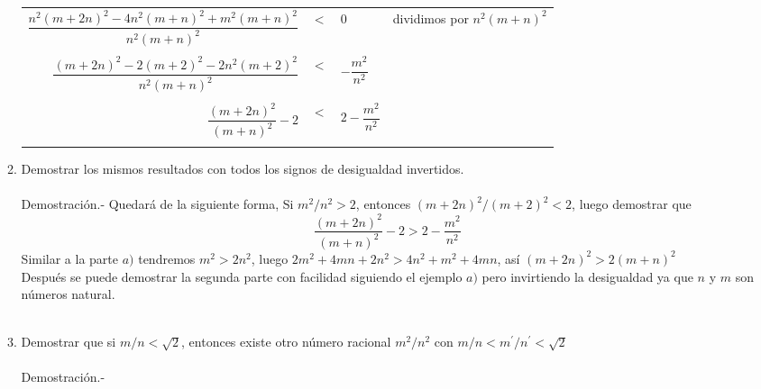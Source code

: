 \begin{enumerate}
\begin{enumerate}[\bfseries (a)]
\begin{center}
\begin{tabular}{r c l l}
$\dfrac{n^2(m+2n)^2 - 4n^2(m+n)^2 + m^2(m+n)^2}{n^2(m+n)^2}$&$<$&$0$&dividimos por $n^2(m+n)^2$\\\\
$\dfrac{(m+2n)^2 - 2(m+2)^2 - 2n^2(m+2)^2}{n^2(m+n)^2}$&$<$&$- \dfrac{m^2}{n^2}$&\\\\
$\dfrac{(m+2n)^2}{(m+n)^2} - 2$&$<$&$2 - \dfrac{m^2}{n^2}$&\\\\
\end{tabular}
\end{center}

\item Demostrar los mismos resultados con todos los signos de desigualdad invertidos. \\\\
Demostración.- \; Quedará de la siguiente forma, Si $m^2/n^2>2$, entonces $\left( m+2n \right)^2 / \left( m + 2 \right)^2 < 2$, luego demostrar que $$\dfrac{\left( m + 2n \right)^2}{\left( m + n \right)^2} - 2 > 2 - \dfrac{m^2}{n^2}$$
Similar a la parte $a)$ tendremos $m^2 > 2n^2$, luego $2m^2 + 4mn + 2n^2 > 4n^2 + m^2 + 4mn$, así $ (m+2n)^2 > 2(m + n)^2 $\\
Después se puede demostrar la segunda parte con facilidad siguiendo el ejemplo $a)$ pero invirtiendo la desigualdad ya que $n$ \; y \; $m$ son números natural.\\\\

\item Demostrar que si $m/n < \sqrt{2}$, entonces existe otro número racional $m^2 / n^2$ con $m/n < m^{'} / n^{'} < \sqrt{2}$\\\\
Demostración.- \; 
\end{enumerate}


\end{enumerate}
